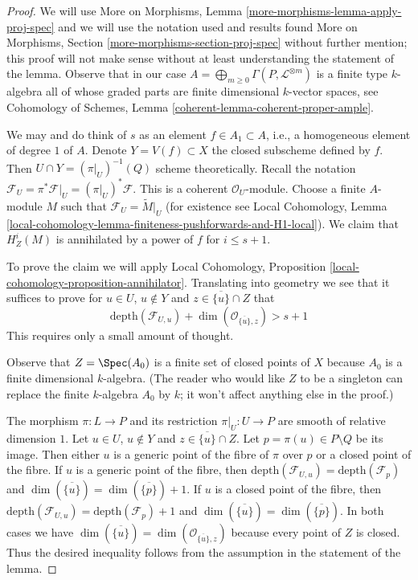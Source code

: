 \begin{proof}
We will use More on Morphisms, Lemma \ref{more-morphisms-lemma-apply-proj-spec}
and we will use the notation used and results found
More on Morphisms, Section \ref{more-morphisms-section-proj-spec}
without further mention; this proof will not make sense without
at least understanding the statement of the lemma.
Observe that in our case
$A = \bigoplus_{m \geq 0} \Gamma(P, \mathcal{L}^{\otimes m})$
is a finite type $k$-algebra
all of whose graded parts are finite dimensional $k$-vector spaces, see
Cohomology of Schemes, Lemma \ref{coherent-lemma-coherent-proper-ample}.

\medskip\noindent
We may and do think of $s$ as an element $f \in A_1 \subset A$, i.e.,
a homogeneous element of degree $1$ of $A$. Denote
$Y = V(f) \subset X$ the closed subscheme defined by $f$.
Then $U \cap Y = (\pi|_U)^{-1}(Q)$ scheme theoretically.
Recall the notation
$\mathcal{F}_U = \pi^*\mathcal{F}|_U = (\pi|_U)^*\mathcal{F}$.
This is a coherent $\mathcal{O}_U$-module.
Choose a finite $A$-module $M$ such that
$\mathcal{F}_U = \widetilde{M}|_U$
(for existence see Local Cohomology, Lemma
\ref{local-cohomology-lemma-finiteness-pushforwards-and-H1-local}).
We claim that $H^i_Z(M)$ is annihilated by
a power of $f$ for $i \leq s + 1$.

\medskip\noindent
To prove the claim we will apply
Local Cohomology, Proposition \ref{local-cohomology-proposition-annihilator}.
Translating into geometry we see that it suffices to prove
for $u \in U$, $u \not \in Y$ and $z \in \overline{\{u\}} \cap Z$
that
$$
\text{depth}(\mathcal{F}_{U, u}) +
\dim(\mathcal{O}_{\overline{\{u\}}, z}) > s + 1
$$
This requires only a small amount of thought.

\medskip\noindent
Observe that $Z = \Spec(A_0)$ is a finite set of closed points of $X$ because
$A_0$ is a finite dimensional $k$-algebra.
(The reader who would like $Z$ to be a singleton can replace the
finite $k$-algebra $A_0$ by $k$; it won't affect anything else in the proof.)

\medskip\noindent
The morphism $\pi : L \to P$ and its restriction $\pi|_U : U \to P$
are smooth of relative dimension $1$.
Let $u \in U$, $u \not \in Y$ and $z \in \overline{\{u\}} \cap Z$.
Let $p = \pi(u) \in P \setminus Q$ be its image.
Then either $u$ is a generic
point of the fibre of $\pi$ over $p$ or a closed point of the fibre.
If $u$ is a generic point of the fibre, then
$\text{depth}(\mathcal{F}_{U, u}) = \text{depth}(\mathcal{F}_p)$
and
$\dim(\overline{\{u\}}) = \dim(\overline{\{p\}}) + 1$.
If $u$ is a closed point of the fibre, then
$\text{depth}(\mathcal{F}_{U, u}) = \text{depth}(\mathcal{F}_p) + 1$
and
$\dim(\overline{\{u\}}) = \dim(\overline{\{p\}})$.
In both cases we have
$\dim(\overline{\{u\}}) = \dim(\mathcal{O}_{\overline{\{u\}}, z})$
because every point of $Z$ is closed. Thus the desired
inequality follows from the assumption in the statement of
the lemma.


\end{proof}
